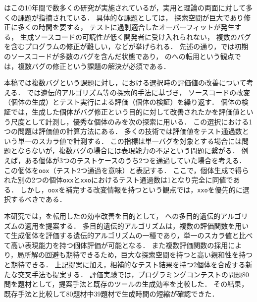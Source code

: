 \documentclass[uplatex,dvipdfmx,a4paper]{jsarticle}
\let\oldcite\cite
\renewcommand{\cite}[1]{\xspace\oldcite{#1}}
\begin{document}
\apr はこの10年間で数多くの研究が実施されている\cite{gazzola2017automatic}が，実用と理論の両面に対して多くの課題が指摘されている．
具体的な課題としては，
探索空間が巨大であり修正に多くの時間を要する\cite{long2016analysis}，
テストに過剰適合したオーバーフィットが発生する\cite{smith2015cure}，
生成ソースコードの可読性が低く開発者に受け入れられない\cite{qi2015analysis}，
複数のバグを含むプログラムの修正が難しい\cite{saha2019harnessing}，などが挙げられる．
先述の通り，\apg では初期のソースコードが多数のバグを含んだ状態であり，
\apr の\apg への転用という観点では，複数バグの修正という課題の解決が必須である．

本稿では複数バグという課題に対し，\apr における選択時の評価値の改善について考える．
\apr では遺伝的アルゴリズム等の探索的手法に基づき，
ソースコードの改変（個体の生成）とテスト実行による評価（個体の検証）を繰り返す．
個体の検証では，生成した個体がバグ修正という目的に対して改善されたかを評価値という尺度として計測し，優秀な個体のみを次の探索に用いる．
%
この選択における1つの問題は評価値の計算方法にある．
多くの\apr 技術では評価値をテスト通過数という単一のスカラ値で計測する\cite{le2011genprog}．
この指標は単一バグを対象とする場合には問題とならないが，複数バグの場合には表現能力の不足という問題に繋がる．
例えば，ある個体が3つのテストケースのうち2つを通過していた場合を考える．
この個体を\verb|oox|（テスト2つ通過を意味）と表記する．
ここで，個体生成で得られた別の2つの個体\verb|oxx|と\verb|xxo|におけるテスト通過数は1となり完全に同値である．
しかし，\verb|oox|を補完する改変情報を持つという観点では，\verb|xxo|を優先的に選択するべきである．

%
%



本研究では，\apr を転用した\apg の効率改善を目的として，
\apr への多目的遺伝的アルゴリズムの適用を提案する．
多目的遺伝的アルゴリズムは，複数の評価関数を用いて生成個体を評価する遺伝的アルゴリズムの一種であり，単一のスカラ値と比べて高い表現能力を持つ個体評価が可能となる．
また複数評価関数の採用により，局所解の回避も期待できる\cite{knowles2001reducing}ため，巨大な探索空間を持つ\apg と高い親和性を持つと期待できる．
上記提案に加え，相補的なテスト結果を持つ2個体を合成する新たな交叉手法も提案する．
評価実験では，プログラミングコンテストの問題80問を題材として，提案手法と既存の\apr ツールの生成効率を比較した．
その結果，既存手法と比較して80題材中39題材で生成時間の短縮が確認できた．
\end{document}
